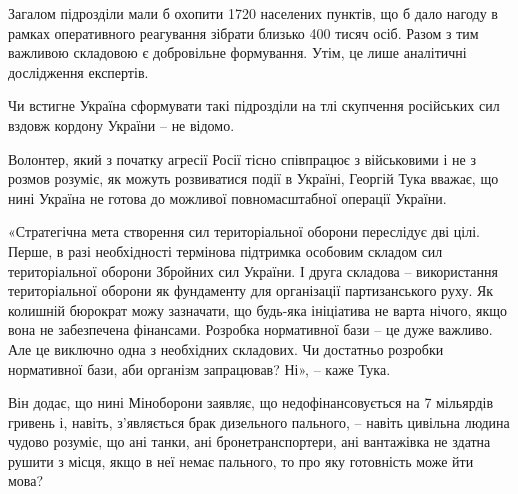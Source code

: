 Загалом підрозділи мали б охопити 1720 населених пунктів, що б дало нагоду в
рамках оперативного реагування зібрати близько 400 тисяч осіб. Разом з тим
важливою складовою є добровільне формування. Утім, це лише аналітичні
дослідження експертів.

Чи встигне Україна сформувати такі підрозділи на тлі скупчення російських сил
вздовж кордону України – не відомо.

Волонтер, який з початку агресії Росії тісно співпрацює з військовими і не з
розмов розуміє, як можуть розвиватися події в Україні, Георгій Тука вважає, що
нині Україна не готова до можливої повномасштабної операції України.

«Стратегічна мета створення сил територіальної оборони переслідує дві цілі.
Перше, в разі необхідності термінова підтримка особовим складом сил
територіальної оборони Збройних сил України. І друга складова – використання
територіальної оборони як фундаменту для організації партизанського руху. Як
колишній бюрократ можу зазначати, що будь-яка ініціатива не варта нічого, якщо
вона не забезпечена фінансами. Розробка нормативної бази – це дуже важливо. Але
це виключно одна з необхідних складових. Чи достатньо розробки нормативної
бази, аби організм запрацював? Ні», – каже Тука.

Він додає, що нині Міноборони заявляє, що недофінансовується на 7 мільярдів
гривень і, навіть, з’являється брак дизельного пального, – навіть цивільна
людина чудово розуміє, що ані танки, ані бронетранспортери, ані вантажівка не
здатна рушити з місця, якщо в неї немає пального, то про яку готовність може
йти мова?




